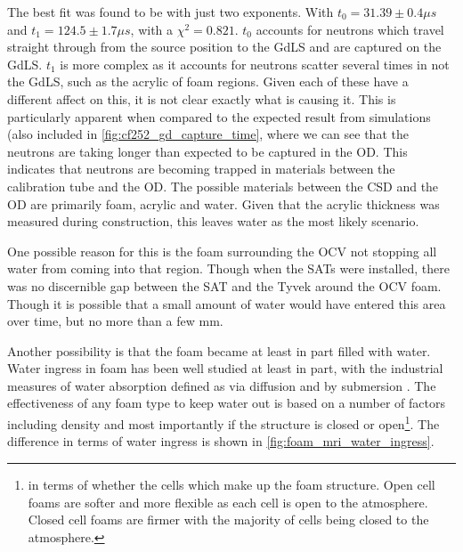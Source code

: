 





\par
The best fit was found to be with just two exponents.
With $t_0 = 31.39 \pm 0.4\mu s$ and $t_1 = 124.5 \pm 1.7\mu s$, with a $\chi^2=0.821$.
$t_0$ accounts for neutrons which travel straight through from the source position to the GdLS and are captured on the GdLS.
$t_1$ is more complex as it accounts for neutrons scatter several times in not the GdLS, such as the acrylic of foam regions.
Given each of these have a different affect on this, it is not clear exactly what is causing it.
This is particularly apparent when compared to the expected result from simulations (also included in \autoref{fig:cf252_gd_capture_time}, where we can see that the neutrons are taking longer than expected to be captured in the OD.
This indicates that neutrons are becoming trapped in materials between the calibration tube and the OD.
The possible materials between the CSD and the OD are primarily foam, acrylic and water.
Given that the acrylic thickness was measured during construction, this leaves water as the most likely scenario.

\par
One possible reason for this is the foam surrounding the OCV not stopping all water from coming into that region.
Though when the SATs were installed, there was no discernible gap between the SAT and the Tyvek around the OCV foam.
Though it is possible that a small amount of water would have entered this area over time, but no more than a few mm.

\par
Another possibility is that the foam became at least in part filled with water.
Water ingress in foam has been well studied at least in part, with the industrial measures of water absorption defined as via diffusion and by submersion \cite{foam_with_water_ref}.
The effectiveness of any foam type to keep water out is based on a number of factors including density and most importantly if the structure is closed or open\footnote{in terms of whether the cells which make up the foam structure. Open cell foams are softer and more flexible as each cell is open to the atmosphere. Closed cell foams are firmer with the majority of cells being closed to the atmosphere.}.
The difference in terms of water ingress is shown in \autoref{fig:foam_mri_water_ingress}.


